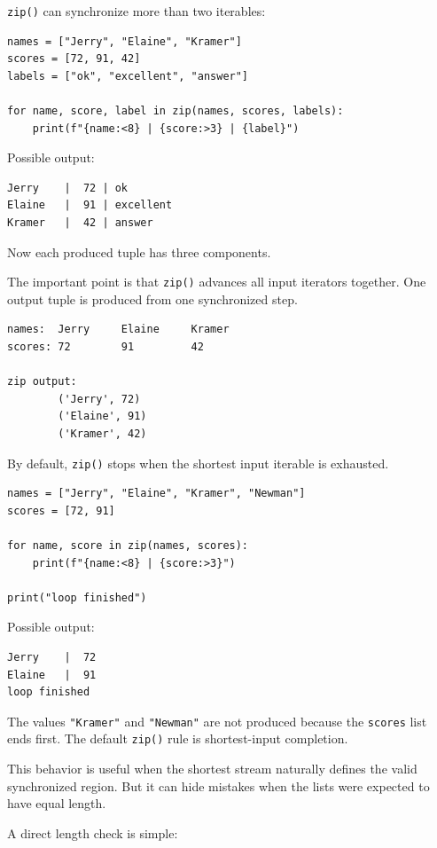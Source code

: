 \documentclass[a4paper,twoside]{report}
\begin{document}
\texttt{zip()} can synchronize more than two iterables:

\begin{verbatim}
names = ["Jerry", "Elaine", "Kramer"]
scores = [72, 91, 42]
labels = ["ok", "excellent", "answer"]

for name, score, label in zip(names, scores, labels):
    print(f"{name:<8} | {score:>3} | {label}")
\end{verbatim}

Possible output:

\begin{verbatim}
Jerry    |  72 | ok
Elaine   |  91 | excellent
Kramer   |  42 | answer
\end{verbatim}

Now each produced tuple has three components.

The important point is that \texttt{zip()} advances all input iterators together. One output tuple is produced from one synchronized step.

\begin{verbatim}
names:  Jerry     Elaine     Kramer
scores: 72        91         42

zip output:
        ('Jerry', 72)
        ('Elaine', 91)
        ('Kramer', 42)
\end{verbatim}

By default, \texttt{zip()} stops when the shortest input iterable is exhausted.

\begin{verbatim}
names = ["Jerry", "Elaine", "Kramer", "Newman"]
scores = [72, 91]

for name, score in zip(names, scores):
    print(f"{name:<8} | {score:>3}")

print("loop finished")
\end{verbatim}

Possible output:

\begin{verbatim}
Jerry    |  72
Elaine   |  91
loop finished
\end{verbatim}

The values \texttt{"Kramer"} and \texttt{"Newman"} are not produced because the \texttt{scores} list ends first. The default \texttt{zip()} rule is shortest-input completion.

This behavior is useful when the shortest stream naturally defines the valid synchronized region. But it can hide mistakes when the lists were expected to have equal length.

A direct length check is simple:
\end{document}
